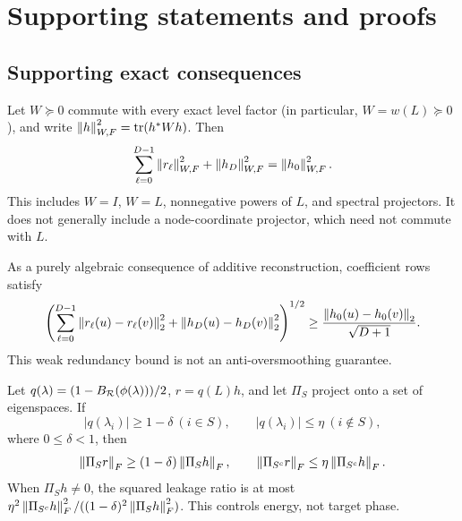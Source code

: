 \section{Supporting statements and proofs}
\label{app:proofs}

\subsection{Supporting exact consequences}

\begin{theorem}
\label{thm:weighted-parseval}
Let $W\succeq0$ commute with every exact level factor (in particular,
$W=w(L)\succeq0$), and write
$\left\lVert h\right\rVert_{W,F}^2=\operatorname{tr}(h^*Wh)$.  Then
\begin{equation}
 \sum_{\ell=0}^{D-1}\left\lVert r_\ell\right\rVert_{W,F}^2
 +\left\lVert h_D\right\rVert_{W,F}^2=\left\lVert h_0\right\rVert_{W,F}^2.
 \label{eq:weighted-parseval}
\end{equation}
This includes $W=I$, $W=L$, nonnegative powers of $L$, and spectral
projectors.  It does not generally include a node-coordinate projector, which
need not commute with $L$.
\end{theorem}

As a purely algebraic consequence of additive reconstruction, coefficient
rows satisfy
\begin{equation}
 \left(\sum_{\ell=0}^{D-1}\left\lVert r_\ell(u)-r_\ell(v)\right\rVert_2^2
       +\left\lVert h_D(u)-h_D(v)\right\rVert_2^2\right)^{1/2}
 \geq\frac{\left\lVert h_0(u)-h_0(v)\right\rVert_2}{\sqrt{D+1}}.
 \label{eq:nodewise-lower}
\end{equation}
This weak redundancy bound is not an anti-oversmoothing guarantee.

\begin{theorem}
\label{thm:energy-separation}
Let $q(\lambda)=(1-B_{\mathcal R}(\phi(\lambda)))/2$, $r=q(L)h$, and
let $\Pi_S$ project onto a set of eigenspaces.  If
\begin{equation}
 |q(\lambda_i)|\geq1-\delta\ (i\in S),
 \qquad |q(\lambda_i)|\leq\eta\ (i\notin S),
 \label{eq:energy-hypotheses}
\end{equation}
where $0\leq\delta<1$, then
\begin{equation}
 \left\lVert \Pi_Sr\right\rVert_F\geq(1-\delta)\left\lVert \Pi_Sh\right\rVert_F,
 \qquad
 \left\lVert \Pi_{S^c}r\right\rVert_F\leq\eta\left\lVert \Pi_{S^c}h\right\rVert_F.
 \label{eq:energy-separation}
\end{equation}
When $\Pi_Sh\neq0$, the squared leakage ratio is at most
$\eta^2\left\lVert \Pi_{S^c}h\right\rVert_F^2/
((1-\delta)^2\left\lVert \Pi_Sh\right\rVert_F^2)$.  This controls energy, not target phase.
\end{theorem}

